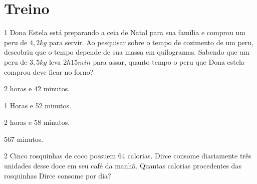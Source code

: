 {{\begin{escolha}[itemsep=0pt]
\end{escolha}


\section*{Treino}

\num{1} Dona Estela está preparando a ceia de Natal para sua família e
comprou um peru de $4,2 kg$ para servir. Ao pesquisar sobre o tempo de
cozimento de um peru, descobriu que o tempo depende de sua massa em
quilogramas. Sabendo que um peru de $3,5 kg$ leva $2h 15min$ para assar,
quanto tempo o peru que Dona estela comprou deve ficar no forno?

\begin{escolha}[itemsep=0pt]
\item 2 horas e 42 minutos.
\item 1 Horas e 52 minutos.
\item 2 horas e 58 minutos.
\item 567 minutos.
\end{escolha}










\num{2} Cinco rosquinhas de coco possuem $64$ calorias. Dirce consome diariamente três
unidades desse doce em seu café da manhã. Quantas calorias procedentes
das rosquinhas Dirce consome por dia?

}}
